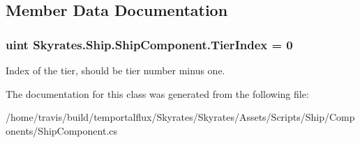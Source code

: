 \subsection{Member Data Documentation}
\hypertarget{class_skyrates_1_1_ship_1_1_ship_component_acb8438da55bb68dfc713c4f340627097}{
\subsubsection[{Tier\-Index}]{\setlength{\rightskip}{0pt plus 5cm}uint Skyrates.\-Ship.\-Ship\-Component.\-Tier\-Index = 0}}\label{class_skyrates_1_1_ship_1_1_ship_component_acb8438da55bb68dfc713c4f340627097}


Index of the tier, should be tier number minus one. 



The documentation for this class was generated from the following file\-:\begin{DoxyCompactItemize}
\item 
/home/travis/build/temportalflux/\-Skyrates/\-Skyrates/\-Assets/\-Scripts/\-Ship/\-Components/Ship\-Component.\-cs\end{DoxyCompactItemize}
